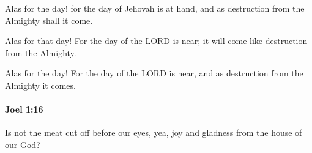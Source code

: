 			\begin{versebox}
					\item[BHS] 
					\item[LXX] 
					\item[ASV] Alas for the day! for the day of Jehovah is at hand, and as destruction from the Almighty shall it come.
					\item[NIV] Alas for that day! For the day of the LORD is near; it will come like destruction from the Almighty.
					\item[NRSV] Alas for the day! For the day of the LORD is near, and as destruction from the Almighty it comes.
			\end{versebox}

		\paragraph{Joel 1:16} %
			\label{JOEL-1-16}

			Is not the meat cut off before our eyes, yea, joy and gladness from the house of our God?

